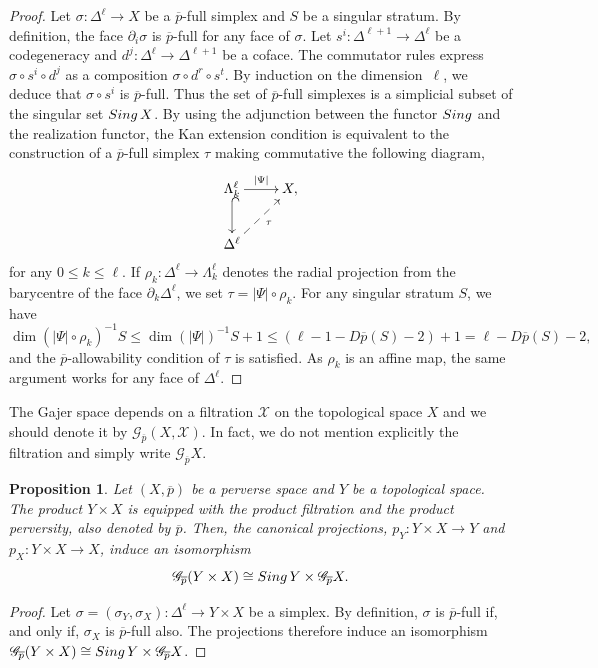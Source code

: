 \documentclass[a4paper,10pt,english,reqno]{amsart}
\theoremstyle{plain}
\newtheorem{proposition}{Proposition}[section]
\theoremstyle{definition}
\theoremstyle{remark}
\numberwithin{equation}{section}
\def\ov{\overline}
\def\crG{{\mathscr G}}
\def\crX{{\mathscr X}}
\def\sing{{\rm Sing}}
\renewcommand\1{\hbox{\ding{192}}}
\renewcommand\2{\hbox{\ding{193}}}
\newcommand\3{\hbox{\ding{194}}}
\newcommand\4{\hbox{\ding{195}}}
\begin{document}
\begin{proof} %
Let $\sigma\colon \Delta^\ell\to X$ be a $\ov{p}$-full simplex and
$S$ be a singular stratum.  By definition, the face $\partial_{i}\sigma$ is  $\ov{p}$-full  for any face of $\sigma$.
%
 Let $s^i\colon \Delta^{\ell+1}\to \Delta^\ell$ be a codegeneracy and $d^j\colon\Delta^\ell \to \Delta^{\ell+1}$
be a coface. The commutator rules %
express
$\sigma\circ s^i\circ d^j$ as a composition $\sigma\circ d^r\circ s^t$. By induction on the dimension~$\ell$, we 
deduce that $\sigma\circ s^i$ is $\ov{p}$-full.
Thus the set of $\ov{p}$-full simplexes is a simplicial subset of the singular set $\sing \,X$.
%
By using the adjunction between the functor $\sing$ and the realization functor, 
the Kan extension condition is equivalent to the construction of
a $\ov{p}$-full simplex $\tau$ making commutative the following diagram,
%
%
%
$$\xymatrix{
\Lambda^\ell_{k}\ar[r]^-{|\Psi |}\ar@{^(->}[d]&X,\\
%
\Delta^\ell\ar@{-->}[ru]_-{\tau}&
}$$
for any $0\leq k\leq \ell$.
%
If $\rho_{k}\colon \Delta^\ell\to \Lambda^\ell_{k}$ denotes the radial projection 
from the barycentre of the face $\partial_{k}\Delta^\ell$, we set
$\tau=|\Psi|\circ \rho_{k}$.
For any singular stratum $S$, we have
$$\dim \left(|\Psi|\circ \rho_{k}\right)^{-1}S \leq 
\dim (|\Psi|)^{-1}S+1 \leq (\ell-1-D\ov{p}(S)-2)+1=\ell -D\ov{p}(S)-2,
$$
%
and the $\ov{p}$-allowability condition of $\tau$ is satisfied.
As $\rho_{k}$ is an affine map, the same argument works for any face of $\Delta^\ell$.
\end{proof}

The Gajer space depends on a filtration $\crX$ on the topological space $X$ and we
should denote it by $\crG_{\ov{p}}(X,\crX)$.
%
In fact,  we do not mention explicitly the filtration  and  simply write $\crG_{\ov{p}}X$.

%
\begin{proposition}{\cite[Example 1]{MR1404919}}\label{prop:homotopyxR}
 Let $(X,\ov{p})$ be a  perverse space 
  and $Y$ be a  topological space. 
%
 The product $Y\times X$ is equipped with the product filtration
 and the product perversity, also denoted by $\ov{p}$.  
%
 Then, the canonical projections, $p_{Y}\colon Y\times X\to Y$ and $p_{X}\colon Y\times X\to X$,
 induce an isomorphism 
 $$\crG_{\ov{p}}(Y\times X)\cong \sing \,Y\times \crG_{\ov{p}}X.$$
%
\end{proposition}

\begin{proof}
Let $\sigma=(\sigma_{Y},\sigma_{X})\colon \Delta^\ell\to Y\times X$ be a simplex.
By definition, $\sigma$ is $\ov{p}$-full if, and only if, $\sigma_{X}$ is $\ov{p}$-full also.
The projections therefore induce an isomorphism
$\crG_{\ov{p}}(Y\times X)\cong \sing \,Y\times \crG_{\ov{p}}X$.
\end{proof}
\end{document}
